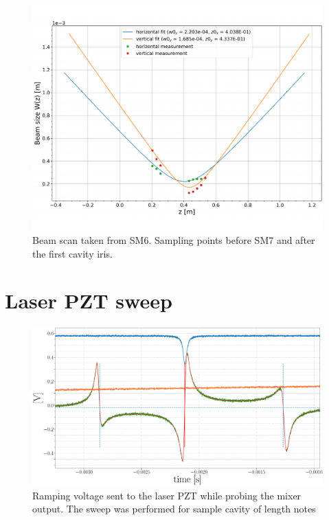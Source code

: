 \begin{figure}[H]
\includegraphics[width=\textwidth]{figs/ALGAAS/beam_scans/01_12_2021_postMMT.pdf}
\caption{Beam scan taken from SM6. Sampling points before SM7 and after the first cavity iris.}
\label{fig:beamscan2021}
\end{figure}

\section{Laser PZT sweep}

\begin{figure}[H]
	\includegraphics[width=\textwidth]{figs/ALGAAS/pdh_measured.pdf}
	\caption{Ramping voltage sent to the laser PZT while probing the mixer output. The sweep was performed for sample cavity of length notes}
\label{fig:pdhmeasured}
\end{figure}

